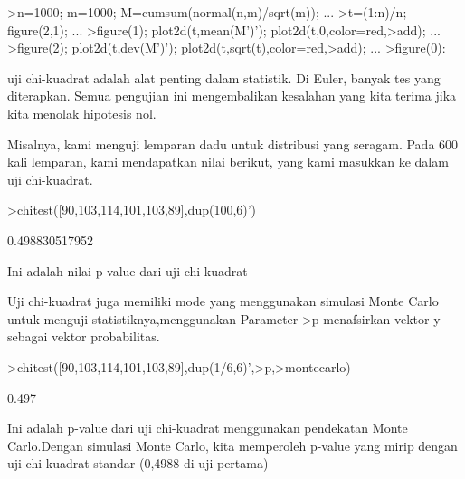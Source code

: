 \documentclass{article}
\begin{document}
\begin{eulernotebook}
\begin{eulercomment}
\begin{eulercomment}
\begin{eulerprompt}
>n=1000; m=1000; M=cumsum(normal(n,m)/sqrt(m)); ...
>t=(1:n)/n; figure(2,1); ...
>figure(1); plot2d(t,mean(M')'); plot2d(t,0,color=red,>add); ...
>figure(2); plot2d(t,dev(M')'); plot2d(t,sqrt(t),color=red,>add); ...
>figure(0):
\end{eulerprompt}
\begin{eulercomment}
uji chi-kuadrat adalah alat penting dalam statistik. Di Euler, banyak
tes yang diterapkan. Semua pengujian ini mengembalikan kesalahan yang
kita terima jika kita menolak hipotesis nol.

Misalnya, kami menguji lemparan dadu untuk distribusi yang seragam.
Pada 600 kali lemparan, kami mendapatkan nilai berikut, yang kami
masukkan ke dalam uji chi-kuadrat.
\end{eulercomment}
\begin{eulerprompt}
>chitest([90,103,114,101,103,89],dup(100,6)')
\end{eulerprompt}
\begin{euleroutput}
  0.498830517952
\end{euleroutput}
\begin{eulercomment}
Ini adalah nilai p-value dari uji chi-kuadrat

Uji chi-kuadrat juga memiliki mode yang menggunakan simulasi Monte
Carlo untuk menguji statistiknya,menggunakan Parameter \textgreater{}p menafsirkan
vektor y sebagai vektor probabilitas.
\end{eulercomment}
\begin{eulerprompt}
>chitest([90,103,114,101,103,89],dup(1/6,6)',>p,>montecarlo)
\end{eulerprompt}
\begin{euleroutput}
  0.497
\end{euleroutput}
\begin{eulercomment}
Ini adalah p-value dari uji chi-kuadrat menggunakan pendekatan Monte
Carlo.Dengan simulasi Monte Carlo, kita memperoleh p-value yang mirip
dengan uji chi-kuadrat standar (0,4988 di uji pertama)


\end{eulercomment}
\end{eulercomment}
\end{eulercomment}
\end{eulernotebook}
\end{document}
